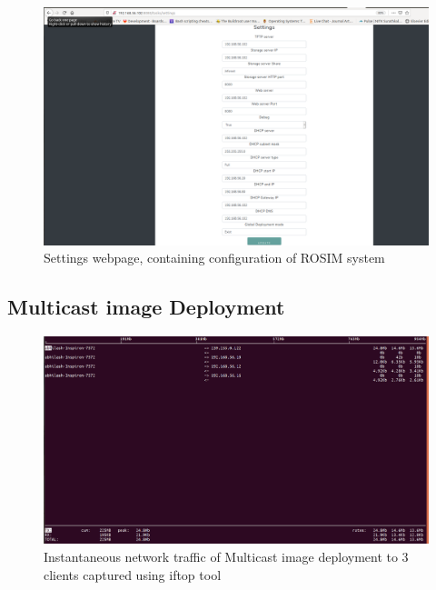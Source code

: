 \documentclass[a4paper,12pt]{article}
\begin{document}
\begin{figure}
    \centering
    \includegraphics[width=\linewidth]{Settings.png}
    \caption{Settings webpage, containing configuration of ROSIM system}
    \label{settings}
\end{figure}


\newpage 


\subsection{ Multicast image Deployment}
\begin{figure}
\centering
  \includegraphics[width=1\linewidth]{multicast_3_iftop.png}
  \caption{Instantaneous network traffic of Multicast image deployment to 3 clients captured using iftop tool}
  \label{multicast_iftop}
\end{figure}
\end{document}
